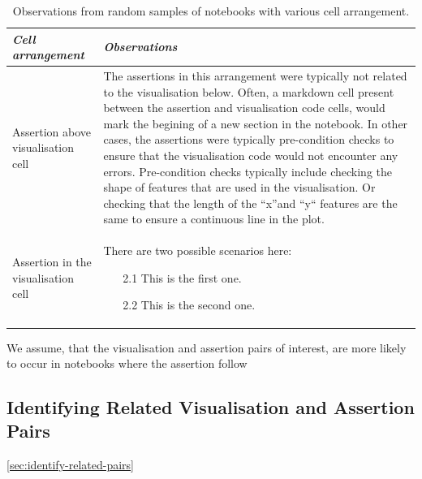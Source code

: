 \documentclass[acmsmall,screen,review,anonymous]{acmart}
\begin{document}
\begin{table}
  \centering
  \caption{Observations from random samples of notebooks with various
  cell arrangement.}
  \begin{tabular}{p{} p{}}
    \toprule
    \emph{\textbf{Cell arrangement}} &
    \emph{\textbf{Observations}}\\
    \midrule
    Assertion above visualisation cell &
    The assertions in this arrangement were typically not related to the visualisation below. Often, a markdown cell present between the assertion and visualisation code cells, would mark the begining of a new section in the notebook. In other cases, the assertions were typically pre-condition checks to ensure that the visualisation code would not encounter any errors. Pre-condition checks typically include checking the shape of features that are used in the visualisation. Or checking that the length of the ``x''and ``y`` features are the same to ensure a continuous line in the plot.\\
    Assertion in the visualisation cell &
    There are two possible scenarios here:
    \begin{enumerate}
    \item[2.1]{This is the first one.}
    \item[2.2]{This is the second one.}
    \end{enumerate}\\

    \bottomrule
  \end{tabular}
  \label{tab:cell-arrangement}
\end{table}

We assume, that the visualisation and assertion pairs of interest, are
more likely to occur in notebooks where the assertion follow

\subsection{Identifying Related Visualisation and Assertion
Pairs}\ref{sec:identify-related-pairs}
\end{document}
